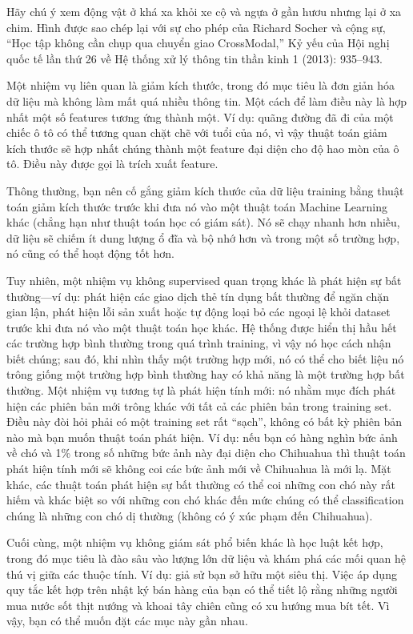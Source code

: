 Hãy chú ý xem động vật ở khá xa khỏi xe cộ và ngựa ở gần hươu nhưng lại ở xa chim. Hình được sao chép lại với sự cho phép của Richard Socher và cộng sự, “Học tập không cần chụp qua chuyển giao CrossModal,” Kỷ yếu của Hội nghị quốc tế lần thứ 26 về Hệ thống xử lý thông tin thần kinh 1 (2013): 935–943.

Một nhiệm vụ liên quan là giảm kích thước, trong đó mục tiêu là đơn giản hóa dữ liệu mà không làm mất quá nhiều thông tin. Một cách để làm điều này là hợp nhất một số features tương ứng thành một. Ví dụ: quãng đường đã đi của một chiếc ô tô có thể tương quan chặt chẽ với tuổi của nó, vì vậy thuật toán giảm kích thước sẽ hợp nhất chúng thành một feature đại diện cho độ hao mòn của ô tô. Điều này được gọi là trích xuất feature.

Thông thường, bạn nên cố gắng giảm kích thước của dữ liệu training bằng thuật toán giảm kích thước trước khi đưa nó vào một thuật toán Machine Learning khác (chẳng hạn như thuật toán học có giám sát). Nó sẽ chạy nhanh hơn nhiều, dữ liệu sẽ chiếm ít dung lượng ổ đĩa và bộ nhớ hơn và trong một số trường hợp, nó cũng có thể hoạt động tốt hơn.

Tuy nhiên, một nhiệm vụ không supervised quan trọng khác là phát hiện sự bất thường—ví dụ: phát hiện các giao dịch thẻ tín dụng bất thường để ngăn chặn gian lận, phát hiện lỗi sản xuất hoặc tự động loại bỏ các ngoại lệ khỏi dataset trước khi đưa nó vào một thuật toán học khác. Hệ thống được hiển thị hầu hết các trường hợp bình thường trong quá trình training, vì vậy nó học cách nhận biết chúng; sau đó, khi nhìn thấy một trường hợp mới, nó có thể cho biết liệu nó trông giống một trường hợp bình thường hay có khả năng là một trường hợp bất thường. Một nhiệm vụ tương tự là phát hiện tính mới: nó nhằm mục đích phát hiện các phiên bản mới trông khác với tất cả các phiên bản trong training set. Điều này đòi hỏi phải có một training set rất “sạch”, không có bất kỳ phiên bản nào mà bạn muốn thuật toán phát hiện. Ví dụ: nếu bạn có hàng nghìn bức ảnh về chó và 1\% trong số những bức ảnh này đại diện cho Chihuahua thì thuật toán phát hiện tính mới sẽ không coi các bức ảnh mới về Chihuahua là mới lạ. Mặt khác, các thuật toán phát hiện sự bất thường có thể coi những con chó này rất hiếm và khác biệt so với những con chó khác đến mức chúng có thể classification chúng là những con chó dị thường (không có ý xúc phạm đến Chihuahua).

Cuối cùng, một nhiệm vụ không giám sát phổ biến khác là học luật kết hợp, trong đó mục tiêu là đào sâu vào lượng lớn dữ liệu và khám phá các mối quan hệ thú vị giữa các thuộc tính. Ví dụ: giả sử bạn sở hữu một siêu thị. Việc áp dụng quy tắc kết hợp trên nhật ký bán hàng của bạn có thể tiết lộ rằng những người mua nước sốt thịt nướng và khoai tây chiên cũng có xu hướng mua bít tết. Vì vậy, bạn có thể muốn đặt các mục này gần nhau.

